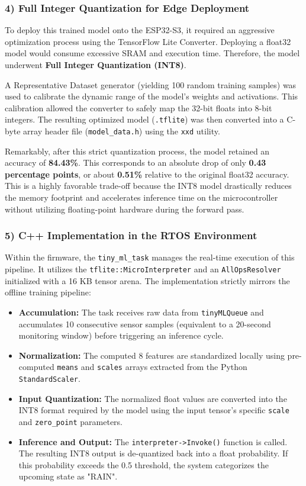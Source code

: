 \subsubsection*{4) Full Integer Quantization for Edge Deployment}
To deploy this trained model onto the ESP32-S3, it required an aggressive optimization process using the TensorFlow Lite Converter. Deploying a float32 model would consume excessive SRAM and execution time. Therefore, the model underwent \textbf{Full Integer Quantization (INT8)}.

A Representative Dataset generator (yielding 100 random training samples) was used to calibrate the dynamic range of the model's weights and activations. This calibration allowed the converter to safely map the 32-bit floats into 8-bit integers. The resulting optimized model (\texttt{.tflite}) was then converted into a C-byte array header file (\texttt{model\_data.h}) using the \texttt{xxd} utility. 

Remarkably, after this strict quantization process, the model retained an accuracy of \textbf{84.43\%}. This corresponds to an absolute drop of only \textbf{0.43 percentage points}, or about \textbf{0.51\%} relative to the original float32 accuracy. This is a highly favorable trade-off because the INT8 model drastically reduces the memory footprint and accelerates inference time on the microcontroller without utilizing floating-point hardware during the forward pass.

\subsubsection*{5) C++ Implementation in the RTOS Environment}
Within the firmware, the \texttt{tiny\_ml\_task} manages the real-time execution of this pipeline. It utilizes the \texttt{tflite::MicroInterpreter} and an \texttt{AllOpsResolver} initialized with a 16 KB tensor arena. The implementation strictly mirrors the offline training pipeline:
\begin{itemize}
    \item \textbf{Accumulation:} The task receives raw data from \texttt{tinyMLQueue} and accumulates 10 consecutive sensor samples (equivalent to a 20-second monitoring window) before triggering an inference cycle.
    \item \textbf{Normalization:} The computed 8 features are standardized locally using pre-computed \texttt{means} and \texttt{scales} arrays extracted from the Python \texttt{StandardScaler}.
    \item \textbf{Input Quantization:} The normalized float values are converted into the INT8 format required by the model using the input tensor's specific \texttt{scale} and \texttt{zero\_point} parameters.
    \item \textbf{Inference and Output:} The \texttt{interpreter->Invoke()} function is called. The resulting INT8 output is de-quantized back into a float probability. If this probability exceeds the 0.5 threshold, the system categorizes the upcoming state as "RAIN".
\end{itemize}

